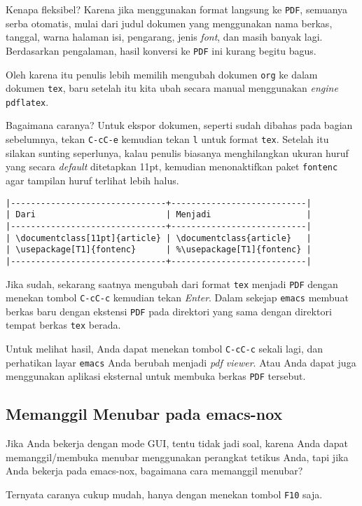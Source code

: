 \documentclass{article}
\begin{document}
Kenapa fleksibel? Karena jika menggunakan format langsung ke \verb=PDF=,
semuanya serba otomatis, mulai dari judul dokumen yang menggunakan nama
berkas, tanggal, warna halaman isi, pengarang, jenis \emph{font}, dan 
masih banyak lagi. Berdasarkan pengalaman, hasil konversi ke \verb=PDF=
ini kurang begitu bagus.

Oleh karena itu penulis lebih memilih mengubah dokumen \verb=org= ke dalam
dokumen \verb=tex=, baru setelah itu kita ubah secara manual menggunakan
\emph{engine} \verb=pdflatex=.

Bagaimana caranya? Untuk ekspor dokumen, seperti sudah dibahas pada bagian
sebelumnya, tekan \verb=C-cC-e= kemudian tekan \verb=l= untuk format 
\verb=tex=. Setelah itu silakan sunting seperlunya, kalau penulis biasanya
menghilangkan ukuran huruf yang secara \emph{default} ditetapkan 11pt,
kemudian menonaktifkan paket \verb=fontenc= agar tampilan huruf terlihat
lebih halus.

\begin{verbatim}
|-------------------------------+---------------------------|
| Dari                          | Menjadi                   |
|-------------------------------+---------------------------|
| \documentclass[11pt]{article} | \documentclass{article}   |
| \usepackage[T1]{fontenc}      | %\usepackage[T1]{fontenc} |
|-------------------------------+---------------------------|
\end{verbatim}

Jika sudah, sekarang saatnya mengubah dari format \verb=tex= menjadi
\verb=PDF= dengan menekan tombol \verb=C-cC-c= kemudian tekan \emph{Enter}.
Dalam sekejap \verb=emacs= membuat berkas baru dengan ekstensi \verb=PDF= pada
direktori yang sama dengan direktori tempat berkas \verb=tex= berada.

Untuk melihat hasil, Anda dapat menekan tombol \verb=C-cC-c= sekali lagi, 
dan perhatikan layar \verb=emacs= Anda berubah menjadi \emph{pdf viewer}. Atau
Anda dapat juga menggunakan aplikasi eksternal untuk membuka berkas \verb=PDF=
tersebut.

\subsection{Memanggil Menubar pada emacs-nox}
Jika Anda bekerja dengan mode GUI, tentu tidak jadi soal, karena Anda dapat
memanggil/membuka menubar menggunakan perangkat tetikus Anda, tapi jika
Anda bekerja pada emacs-nox, bagaimana cara memanggil menubar? 

Ternyata caranya cukup mudah, hanya dengan menekan tombol \verb=F10= saja.
\end{document}
